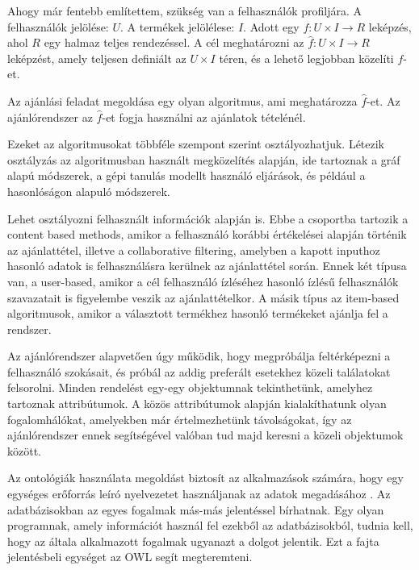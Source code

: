 
Ahogy már fentebb említettem, szükség van a felhasználók profiljára. A felhasználók jelölése: $U$. A termékek jelölélese: $I$. Adott egy $f: U \times I \rightarrow R$ leképzés, ahol $R$ egy halmaz teljes rendezéssel. A cél meghatározni az $\hat{f}: U \times I \rightarrow R$ leképzést, amely teljesen definiált az $U \times I$ téren, és a lehető legjobban közelíti $f$-et.


Az ajánlási feladat megoldása egy olyan algoritmus, ami meghatározza $\hat{f}$-et. Az ajánlórendszer az $\hat{f}$-et fogja használni az ajánlatok tételénél.


Ezeket az algoritmusokat többféle szempont szerint osztályozhatjuk. Létezik osztályzás az algoritmusban használt megközelítés alapján, ide tartoznak a gráf alapú módszerek, a gépi tanulás modellt használó eljárások, és például a hasonlóságon alapuló módszerek.

Lehet osztályozni felhasznált információk alapján is. Ebbe a csoportba tartozik a content based methods, amikor a felhasználó korábbi értékelései alapján történik az ajánlattétel, illetve a collaborative filtering, amelyben a kapott inputhoz hasonló adatok is felhasználásra kerülnek az ajánlattétel során. Ennek két típusa van, a user-based, amikor a cél felhasználó ízléséhez hasonló ízlésű felhasználók szavazatait is figyelembe veszik az ajánlattételkor. A másik típus az item-based algoritmusok, amikor a választott termékhez hasonló termékeket ajánlja fel a rendszer.

\newpage


Az ajánlórendszer alapvetően úgy működik, hogy megpróbálja feltérképezni a felhasználó szokásait, és próbál az addig preferált esetekhez közeli találatokat felsorolni. Minden rendelést egy-egy objektumnak tekinthetünk, amelyhez tartoznak attribútumok. A közös attribútumok alapján kialakíthatunk olyan fogalomhálókat, amelyekben már értelmezhetünk távolságokat, így az ajánlórendszer ennek segítségével valóban tud majd keresni a közeli objektumok között.

Az ontológiák használata megoldást biztosít az alkalmazások számára, hogy egy egységes erőforrás leíró nyelvezetet használjanak az adatok megadásához \cite{owl}. Az adatbázisokban az egyes fogalmak más-más jelentéssel bírhatnak. Egy olyan programnak, amely információt használ fel ezekből az adatbázisokból, tudnia kell, hogy az általa alkalmazott fogalmak ugyanazt a dolgot jelentik. Ezt a fajta jelentésbeli egységet az OWL segít megteremteni.

